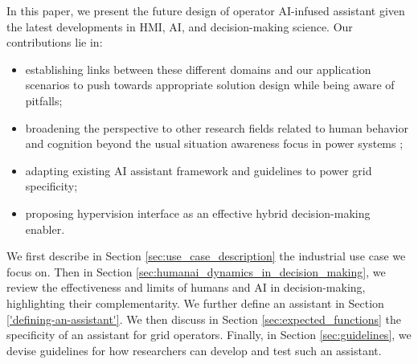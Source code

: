 \documentclass{IOS-Book-Article}
\begin{document}
In this paper, we present the future design of operator AI-infused assistant given the latest developments in HMI, AI, and decision-making science. Our contributions lie in:
\begin{itemize}
    \item establishing links between these different domains and our application scenarios to push towards appropriate solution design while being aware of pitfalls;%
    \item broadening the perspective to other research fields related to human behavior and cognition beyond the usual situation awareness focus in power systems \cite{prostejovsky2019future, panteli2015situation};
    \item adapting existing AI assistant framework and guidelines to power grid specificity; %
    \item proposing hypervision interface as an effective hybrid decision-making enabler.
\end{itemize}
We first describe in Section \ref{sec:use_case_description} the industrial use case we focus on. Then in Section \ref{sec:humanai_dynamics_in_decision_making}, we review the effectiveness and limits of humans and AI in decision-making, highlighting their complementarity. We further define an assistant in Section \ref{'defining-an-assistant'}. We then discuss in Section \ref{sec:expected_functions} the specificity of an assistant for grid operators. Finally, in Section \ref{sec:guidelines}, we devise guidelines for how researchers can develop and test such an assistant. 
\end{document}
